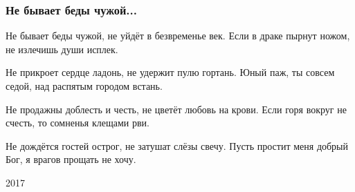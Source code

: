  
 
 

\subsubsection{Не бывает беды чужой...}

Не бывает беды чужой,
не уйдёт в безвременье век.
Если в драке пырнут ножом,
не излечишь души исплек.

Не прикроет сердце ладонь,
не удержит пулю гортань.
Юный паж, ты совсем седой,
над распятым городом встань.

Не продажны доблесть и честь,
не цветёт любовь на крови.
Если горя вокруг не счесть,
то сомненья клещами рви.

Не дождётся гостей острог,
не затушат слёзы свечу.
Пусть простит меня добрый Бог,
я врагов прощать не хочу.

2017 
